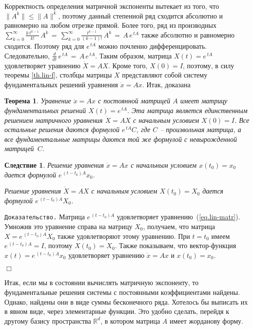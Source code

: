 \documentclass[12pt,a4paper]{article}
\newtheorem{theorem}{Теорема}
\newtheorem{cor}{Следствие}
\newcommand{\re}{{\mathbb R}}
\begin{document}
Корректность определения матричной экспоненты вытекает из того, что $\|A^k\| \le \|A\|^k$, поэтому данный степенной ряд сходится
абсолютно и равномерно на любом отрезке прямой.
Более того, ряд из производных $\sum_{k=0}^{\infty} \frac{k\, t^{k-1}}{k!}\, A^k\, = \,
\sum_{k=0}^{\infty} \frac{t^{k-1}}{(k-1)!} \, A^k \, = \, A \, e^{\, tA}$ также абсолютно и равномерно сходится. Поэтому ряд для
$e^{\,t A}$ можно
почленно дифференцировать. Следовательно,  $\frac{d}{dt}\, e^{\, tA}\, = \, A\, e^{\, tA}$. Таким образом,
матрица $X(t) = e^{\, tA}$ удовлетворяет уравнению $\dot X = AX$. Кроме того, $X(0) = I$, поэтому, в силу теоремы
\ref{th.lin-f}, столбцы матрицы $X$ представляют собой систему фундаментальных решений уравнения $\dot x = Ax$.
 Итак, доказана
\begin{theorem}\label{th.exp}
Уравнение $\dot x = Ax$ с постоянной матрицей $A$ имеет матрицу  фундаментальных решений $X(t) = e^{\, tA}$.
Эта матрица является единственным решением матричного уравнения $\dot X = AX$ с начальным условием $X(0) = I$.
Все остальные решения даются формулой $e^{\, t A}C$, где $C$ -- произвольная матрица, а все фундаментальные матрицы даются той же формулой с невырожденной матрицей~$C$.
\end{theorem}
\begin{cor}\label{c.lin-exp3}
Решение уравнения $\dot x = Ax$ с начальным условием $x(t_0) = x_0$ дается формулой
$e^{\, (t-t_0)A}x_0$.

 Решение уравнения $\dot X = AX$ с начальным условием $X(t_0) = X_0$ дается формулой
$e^{\, (t-t_0)A}X_0$.
\end{cor}
{\tt Доказательство.} Матрица $e^{\, (t-t_0)A}$ удовлетворяет уравнению~(\ref{eq.lin-matr}).
Умножив это уравнение справа на матрицу $X_0$, получаем, что матрица $X = e^{\, (t-t_0)A}X_0$
также удовлетворяют этому уравнению. При $t = t_0$ имеем $e^{\, (t-t_0)A} = I$, поэтому $X(t_0) = X_0$.
Также показываем, что  вектор-функция $x(t) = e^{\, (t-t_0)A}x_0$ удовлетворяет уравнению $\dot x = Ax$
и $x(t_0) = x_0$.




   {\hfill $\Box$}
\medskip


Итак, если мы в состоянии вычислять матричную экспоненту, то фундаментальные решения
системы с постоянными коэффициентами найдены. Однако, найдены они в виде суммы бесконечного ряда.
Хотелось бы выписать их в явном виде, через элементарные функции. Это удобно сделать, перейдя к
другому базису пространства $\re^d$, в котором матрица $A$ имеет жорданову форму.
\end{document}
